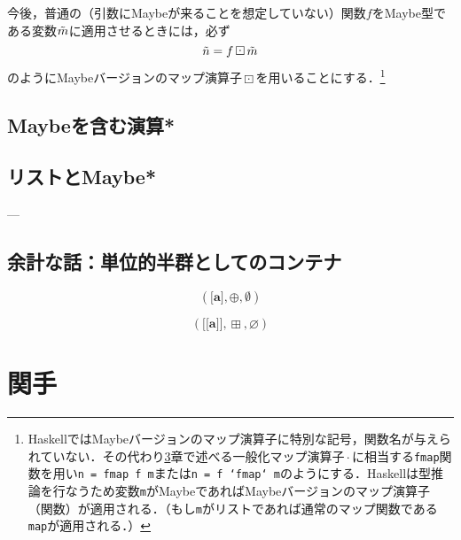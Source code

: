 \documentclass[twocolumn]{jsbook}
\def\[{[\![}
\def\]{]\!]}
\newcommand{\code}[1]{\texttt{#1}}
\newcommand{\hsklType}[1]{\textbf{#1}}
\DeclareMathOperator{\hsklFmap}{\cdot}
\DeclareMathOperator{\hsklMaybeAppend}{\boxplus}
\DeclareMathOperator{\hsklMaybeMap}{\boxdot}
\newcommand{\hsklAppend}{\oplus}
\newcommand{\hsklEmptyList}{\emptyset}
\newcommand{\hsklNothing}{\varnothing}
\newcommand{\hsklListType}[1]{\boldsymbol{[}#1\boldsymbol{]}}
\newcommand{\hsklMaybe}[1]{\Tilde{#1}}
\newcommand{\hsklMaybeType}[1]{\boldsymbol{\[}#1\boldsymbol{\]}}
\newcommand{\mathMonoid}[3]{(#1,#2,#3)}
\begin{document}
今後，普通の（引数にMaybeが来ることを想定していない）関数$f$をMaybe型である変数$\hsklMaybe{m}$に適用させるときには，必ず$$\hsklMaybe{n}=f\hsklMaybeMap\hsklMaybe{m}$$のようにMaybeバージョンのマップ演算子$\hsklMaybeMap$を用いることにする．\footnote{HaskellではMaybeバージョンのマップ演算子に特別な記号，関数名が与えられていない．その代わり\ref{ch:functor}章で述べる一般化マップ演算子$\hsklFmap$に相当する\code{fmap}関数を用い\code{n = fmap f m}または\code{n = f `fmap` m}のようにする．Haskellは型推論を行なうため変数\code{m}がMaybeであればMaybeバージョンのマップ演算子（関数）が適用される．（もし\code{m}がリストであれば通常のマップ関数である\code{map}が適用される．）}



\section{Maybeを含む演算*}

\section{リストとMaybe*}

---


\section*{余計な話：単位的半群としてのコンテナ}

$$\mathMonoid{\hsklListType{\hsklType{a}}}{\hsklAppend}{\hsklEmptyList}$$

$$\mathMonoid{\hsklMaybeType{\hsklType{a}}}{\hsklMaybeAppend}{\hsklNothing}$$





\chapter{関手}
\label{ch:functor}
\end{document}
